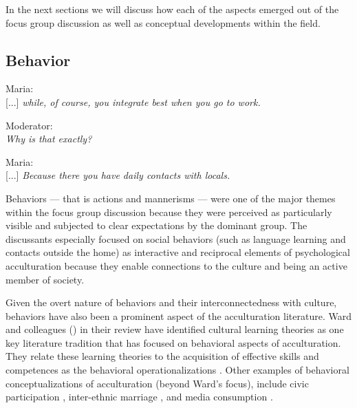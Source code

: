 \documentclass[man, 12pt, a4paper, mask]{apa7}
\begin{document}
In the next sections we will discuss how each of the aspects emerged out of the focus group discussion as well as conceptual developments within the field. 

\subsection{Behavior}
\begin{displayquote}
    Maria:\\
    {[...]} \textit{while, of course, you integrate best when you go to work.}
    
    Moderator:\\
    \textit{Why is that exactly?}
    
    Maria:\\
    {[...]} \textit{Because there you have daily contacts with locals.}
\end{displayquote}

Behaviors --- that is actions and mannerisms --- were one of the major themes within the focus group discussion because they were perceived as particularly visible and subjected to clear expectations by the dominant group. The discussants especially focused on social behaviors (such as language learning and contacts outside the home) as interactive and reciprocal elements of psychological acculturation because they enable connections to the culture and being an active member of society.

Given the overt nature of behaviors and their interconnectedness with culture, behaviors have also been a prominent aspect of the acculturation literature. Ward and colleagues (\citeyear{Ward2019}) in their review have identified cultural learning theories as one key literature tradition that has focused on behavioral aspects of acculturation. They relate these learning theories to the acquisition of effective skills and competences as the behavioral operationalizations \citep[including, verbal and non-verbal communication skills][]{Ward2001}. Other examples of behavioral conceptualizations of acculturation (beyond Ward's focus), include civic participation \citep[e.g., voting;][]{Lessard-Phillips2020}, inter-ethnic marriage \citep[e.g.,][]{Song2009}, and media consumption \citep[e.g.,][]{Shoemaker1985}. 
\end{document}
